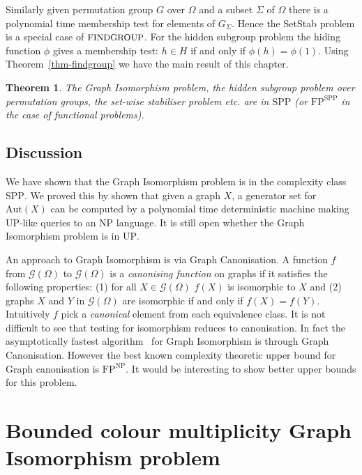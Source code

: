 \documentclass[11pt]{madras}%
\newtheorem{theorem}{Theorem}[chapter]
\theoremstyle{remark}
\newcommand{\Aut}[1]{{\ensuremath{\mathrm{Aut}\left(#1\right)}}}
\newcommand{\ProblemFont}[1]{{\ensuremath{\textrm{\small #1}}}}
\begin{document}
Similarly given permutation group $G$ over $\Omega$ and a subset
$\Sigma$ of $\Omega$ there is a polynomial time membership test for
elements of $G_\Sigma$. Hence the {\sc SetStab} problem is a special
case of $\ProblemFont{FINDGROUP}$. For the hidden subgroup problem the
hiding function $\phi$ gives a membership test: $h \in H$ if and only
if $\phi(h) = \phi(1)$.  Using Theorem~\ref{thm-findgroup} we have the
main result of this chapter.


\begin{theorem}
  The Graph Isomorphism problem, the hidden subgroup problem over
  permutation groups, the set-wise stabiliser problem etc. are in
  $\mathrm{SPP}$ (or $\mathrm{FP}^{\mathrm{SPP}}$ in the case of
  functional problems).
\end{theorem}












\section{Discussion}

We have shown that the Graph Isomorphism problem is in the complexity
class $\mathrm{SPP}$. We proved this by shown that given a graph $X$,
a generator set for $\Aut{X}$ can be computed by a polynomial time
deterministic machine making $\mathrm{UP}$-like queries to an
$\mathrm{NP}$ language. It is still open whether the Graph Isomorphism
problem is in $\mathrm{UP}$.

An approach to Graph Isomorphism is via Graph Canonisation. A function
$f$ from $\mathcal{G}(\Omega)$ to $\mathcal{G}(\Omega)$ is a
\emph{canonising function} on graphs if it satisfies the following
properties: (1) for all $X \in \mathcal{G}(\Omega)$ $f(X)$ is
isomorphic to $X$ and (2) graphs $X$ and $Y$ in $\mathcal{G}(\Omega)$
are isomorphic if and only if $f(X) = f(Y)$. Intuitively $f$ pick a
\emph{canonical} element from each equivalence class. It is not
difficult to see that testing for isomorphism reduces to canonisation.
In fact the asymptotically fastest
algorithm~\cite{zemlyachenko85gi,babai83canonical} for Graph
Isomorphism is through Graph Canonisation. However the best known
complexity theoretic upper bound for Graph canonisation is
$\mathrm{FP}^{\mathrm{NP}}$. It would be interesting to show better
upper bounds for this problem.
\chapter{Bounded colour multiplicity Graph Isomorphism problem}
\label{chap-bcgi}
\end{document}
